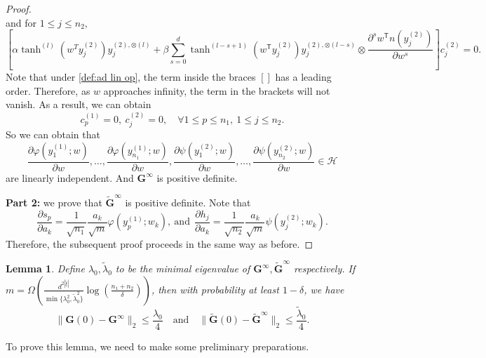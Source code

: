 \documentclass{article}
\newtheorem{lemma}{Lemma}
\newcommand{\T}{\mathsf{T}}
\begin{document}
\begin{proof}
\begin{equation}
\end{equation}
and for $1\le j\le n_2$,
\begin{equation}
    \left[\alpha \tanh^{(l)}(w^T y_j^{(2)}) y_j^{(2), \otimes (l)}+\beta \sum_{s=0}^{d}\tanh^{(l-s+1)}(w^\T y_j^{(2)})y_j^{(2), \otimes (l-s)}\otimes \frac{\partial^s w^\T n(y_j^{(2)})}{\partial w^s}\right]c_j^{(2)}=0. \label{eq:c_2}
\end{equation}
Note that under \cref{def:ad lin op}, the term inside the braces $[]$ has a leading order. Therefore, as \( w \) approaches infinity, the term in the brackets will not vanish. As a result, we can obtain
\begin{equation*}
    c_p^{(1)}=0, \ c_{j}^{(2)}=0, \quad \forall 1\le p\le n_1,\ 1\le j\le n_2.
\end{equation*}
So we can obtain that
\begin{equation*}
\frac{\partial \varphi(y_1^{(1)}; w)}{\partial w}, \ldots, \frac{\partial \varphi(y_{n_1}^{(1)}; w)}{\partial w}, 
\frac{\partial \psi(y_1^{(2)}; w)}{\partial w}, \ldots, \frac{\partial \psi(y_{n_2}^{(2)}; w)}{\partial w} \in \mathcal{H}
\end{equation*}
are linearly independent. And $\mathbf{G}^{\infty}$ is positive definite.

\textbf{Part 2:} we prove that $\mathbf{\widetilde{G}}^{\infty}$ is positive definite.
Note that
\begin{equation*}
    \frac{\partial s_p}{\partial a_k} = \frac{1}{\sqrt{n_1}} \frac{a_k}{\sqrt{m}} \varphi(y_p^{(1)};w_k),\ \text{and} \ \ \frac{\partial h_j}{\partial a_k} = \frac{1}{\sqrt{n_2}} \frac{a_k}{\sqrt{m}}\psi(y_j^{(2)};w_k).
\end{equation*}
Therefore, the subsequent proof proceeds in the same way as before.
\end{proof}

\begin{lemma}\label{lem:step2}
Define $\lambda_0, \tilde{\lambda}_0$ to be the minimal eigenvalue of $\mathbf{G}^{\infty}, \widetilde{\mathbf{G}}^{\infty}$ respectively.
If $m=\Omega\left(\frac{d^{2|\tilde{\xi}|}}{\min\{\lambda_0^2, \tilde\lambda_0^2\}}\log\left(\frac{n_1+n_2}{\delta}\right)\right)$, then with probability at least $1 - \delta$, we have
\begin{equation*}
\| \mathbf{G}(0) - \mathbf{G}^{\infty} \|_2 \leq \frac{\lambda_0}{4} 
\quad \text{and} \quad 
\| \widetilde{\mathbf{G}}(0) - \widetilde{\mathbf{G}}^{\infty} \|_2 \leq \frac{\tilde{\lambda}_0}{4}. 
\end{equation*}
\end{lemma}
To prove this lemma, we need to make some preliminary preparations.
\end{document}
